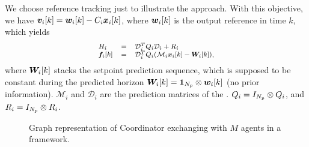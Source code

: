 \documentclass{ifacconf}  %
\begin{document}
We choose reference tracking just to illustrate the approach. With this objective, we have
${\vik=\wik-C_{i}\xik}$, where $\wik$ is the output reference in time $k$, which yields
\begin{equation}
\small\begin{matrix*}[l]
 H_i&=&\mathcal{D}_i^T\bar{Q}_i\mathcal{D}_i+\bar{R}_i\\
\fik&=&\mathcal{D}_i^T\bar{Q}_i(\mathcal{M}_i\xik-\Wik),
\end{matrix*}
\label{eq:matrices}
\end{equation}
where $\Wik$ stacks the setpoint prediction sequence, which is supposed to be constant during the predicted horizon ${\Wik=\kron{\1_{\predhorz}}{\vec{w}_{i}[k]}}$ (no prior information).
${\mathcal{M}_{i}}$  and ${\mathcal{D}_{i}}$ are the prediction matrices of the \mpc{}.
${\relax{Q}_{i}=I_{N_{p}}\mathbin{\otimes}Q_{i}}$, and ${\relax{R}_{i}=I_{N_{p}}\mathbin{\otimes}R_{i}}$.

\begin{figure}[t]
  \centering
  \caption{Graph representation of Coordinator exchanging with $M$ agents in a \dmpc{} framework.}\label{fig:dmpc_graph}
\end{figure}
\end{document}

